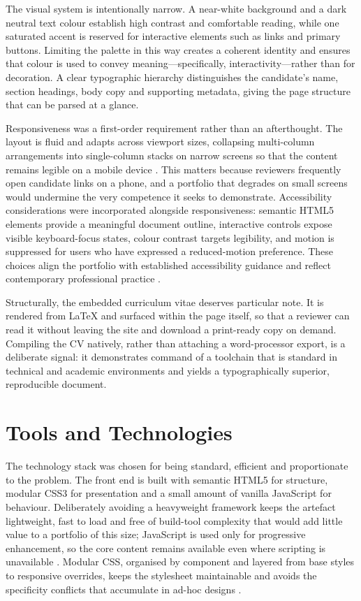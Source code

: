 \documentclass[11pt,a4paper]{article}
\begin{document}
The visual system is intentionally narrow. A near-white background and a dark neutral text colour establish high contrast and comfortable reading, while one saturated accent is reserved for interactive elements such as links and primary buttons. Limiting the palette in this way creates a coherent identity and ensures that colour is used to convey meaning---specifically, interactivity---rather than for decoration. A clear typographic hierarchy distinguishes the candidate's name, section headings, body copy and supporting metadata, giving the page structure that can be parsed at a glance.

Responsiveness was a first-order requirement rather than an afterthought. The layout is fluid and adapts across viewport sizes, collapsing multi-column arrangements into single-column stacks on narrow screens so that the content remains legible on a mobile device \citep{marcotte2011}. This matters because reviewers frequently open candidate links on a phone, and a portfolio that degrades on small screens would undermine the very competence it seeks to demonstrate. Accessibility considerations were incorporated alongside responsiveness: semantic HTML5 elements provide a meaningful document outline, interactive controls expose visible keyboard-focus states, colour contrast targets legibility, and motion is suppressed for users who have expressed a reduced-motion preference. These choices align the portfolio with established accessibility guidance \citep{w3c2018} and reflect contemporary professional practice \citep{mdn2024}.

Structurally, the embedded curriculum vitae deserves particular note. It is rendered from \LaTeX{} and surfaced within the page itself, so that a reviewer can read it without leaving the site and download a print-ready copy on demand. Compiling the CV natively, rather than attaching a word-processor export, is a deliberate signal: it demonstrates command of a toolchain that is standard in technical and academic environments and yields a typographically superior, reproducible document.

\section{Tools and Technologies}
The technology stack was chosen for being standard, efficient and proportionate to the problem. The front end is built with semantic HTML5 for structure, modular CSS3 for presentation and a small amount of vanilla JavaScript for behaviour. Deliberately avoiding a heavyweight framework keeps the artefact lightweight, fast to load and free of build-tool complexity that would add little value to a portfolio of this size; JavaScript is used only for progressive enhancement, so the core content remains available even where scripting is unavailable \citep{mdn2024}. Modular CSS, organised by component and layered from base styles to responsive overrides, keeps the stylesheet maintainable and avoids the specificity conflicts that accumulate in ad-hoc designs \citep{duckett2011}.
\end{document}
